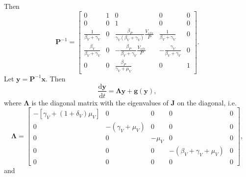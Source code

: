 \documentclass{article}
\newcommand{\md}{\mathrm{d}}
\newcommand{\mat}[1]{\mathbf{#1}}
\renewcommand{\vec}[1]{\mathbf{#1}}
\begin{document}
Then
\begin{equation}
  \mat{P}^{-1} =
  \begin{bmatrix}
    0 & 1 & 0 & 0 & 0 \\
    0 & 0 & 1 & 0 & 0 \\
    \frac{1}{\beta_V + \gamma_V} & 0 &
    \frac{\beta_P}{\gamma_V (\beta_V + \gamma_V)} \frac{V_{sfs}}{P} &
    \frac{1}{\beta_V + \gamma_V} & 0 \\
    \frac{\beta_V}{\beta_V + \gamma_V} & 0 &
    - \frac{\beta_P}{\beta_V + \gamma_V} \frac{V_{sfs}}{P} &
    - \frac{\gamma_V}{\beta_V + \gamma_V} & 0 \\
    0 & 0 & \frac{\beta_P}{\gamma_V + \mu_V} & 0 & 1
  \end{bmatrix}.
\end{equation}
Let $\vec{y} = \mat{P}^{-1} \vec{x}$.  Then
\begin{equation}
  \label{diagonal}
  \frac{\md \vec{y}}{\md t} = \mat{\Lambda} \vec{y} + \vec{g}(\vec{y}),
\end{equation}
where $\mat{\Lambda}$ is the diagonal matrix with the eigenvalues of
$\mat{J}$ on the diagonal, i.e.
\begin{equation}
  \mat{\Lambda} =
  \begin{bmatrix}
    - [\gamma_V + (1 + \delta_V) \mu_V] & 0 & 0 & 0 & 0 \\
    0 & - (\gamma_V + \mu_V) & 0 & 0 & 0 \\
    0 & 0 & - \mu_V & 0 & 0 \\
    0 & 0 & 0 & - (\beta_V + \gamma_V + \mu_V) & 0 \\
    0 & 0 & 0 & 0 & 0
  \end{bmatrix},
\end{equation}
and
\end{document}
